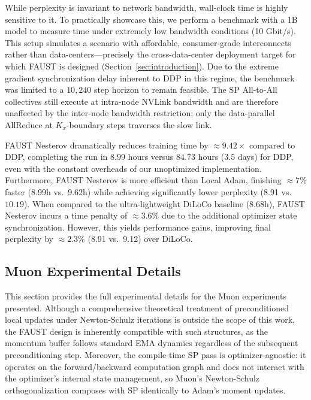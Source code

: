 \documentclass{article}
\begin{document}
While perplexity is invariant to network bandwidth, wall-clock time is highly sensitive to it. To practically showcase this, we perform a benchmark with a 1B model to measure time under extremely low bandwidth conditions (10 Gbit/s). This setup simulates a scenario with affordable, consumer-grade interconnects rather than data-centers---precisely the cross-data-center deployment target for which FAUST is designed (Section~\ref{sec:introduction}). Due to the extreme gradient synchronization delay inherent to DDP in this regime, the benchmark was limited to a $10{,}240$ step horizon to remain feasible. The SP All-to-All collectives still execute at intra-node NVLink bandwidth and are therefore unaffected by the inter-node bandwidth restriction; only the data-parallel AllReduce at $K_x$-boundary steps traverses the slow link.


FAUST Nesterov dramatically reduces training time by $\approx 9.42\times$ compared to DDP, completing the run in $8.99$ hours versus $84.73$ hours ($3.5$ days) for DDP, even with the constant overheads of our unoptimized implementation. Furthermore, FAUST Nesterov is more efficient than Local Adam, finishing $\approx 7\%$ faster (8.99h vs.\ 9.62h) while achieving significantly lower perplexity (8.91 vs.\ $10.19$). When compared to the ultra-lightweight DiLoCo baseline (8.68h), FAUST Nesterov incurs a time penalty of $\approx 3.6\%$ due to the additional optimizer state synchronization. However, this yields performance gains, improving final perplexity by $\approx 2.3\%$ (8.91 vs.\ 9.12) over DiLoCo.


\subsection{Muon Experimental Details }
\label{sec:b7_muon_details}
\label{sec:muon_details}

This section provides the full experimental details for the Muon experiments presented. Although a comprehensive theoretical treatment of preconditioned local updates under Newton-Schulz iterations is outside the scope of this work, the FAUST design is inherently compatible with such structures, as the momentum buffer follows standard EMA dynamics regardless of the subsequent preconditioning step. Moreover, the compile-time SP pass is optimizer-agnostic: it operates on the forward/backward computation graph and does not interact with the optimizer's internal state management, so Muon's Newton-Schulz orthogonalization composes with SP identically to Adam's moment updates.
\end{document}
